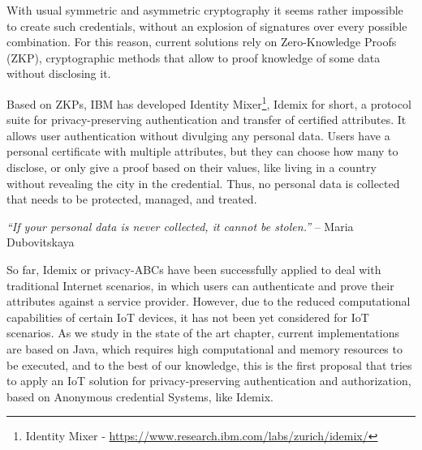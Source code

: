 \documentclass[journal]{IEEEtran}
\begin{document}
With usual symmetric and asymmetric cryptography it seems rather impossible to create such credentials, without an explosion of signatures over every possible combination. For this reason, current solutions rely on  Zero-Knowledge Proofs (ZKP), cryptographic methods that allow to proof knowledge of some data without disclosing it.

Based on ZKPs, IBM has developed Identity Mixer\footnote{Identity Mixer - \url{https://www.research.ibm.com/labs/zurich/idemix/}}, Idemix for short, a protocol suite for privacy-preserving authentication and transfer of certified attributes. It allows user authentication without divulging any personal data. Users have a personal certificate with multiple attributes, but they can choose how many to disclose, or only give a proof based on their values, like living in a country without revealing the city in the credential. Thus, no personal data is collected that needs to be protected, managed, and treated.

\begin{center}
	\textit{``If your personal data is never collected, it cannot be stolen.''} -- Maria Dubovitskaya
\end{center}

So far, Idemix or privacy-ABCs have been successfully applied to deal with traditional Internet scenarios, in which users can authenticate and prove their attributes against a service provider. However, due to the reduced computational capabilities of certain IoT devices, it has not been yet considered for IoT scenarios. As we study in the state of the art chapter, current implementations are based on Java, which requires high computational and memory resources to be executed, and to the best of our knowledge, this is the first proposal that tries to apply an IoT solution for privacy-preserving authentication and authorization, based on Anonymous credential Systems, like Idemix.


\end{document}
